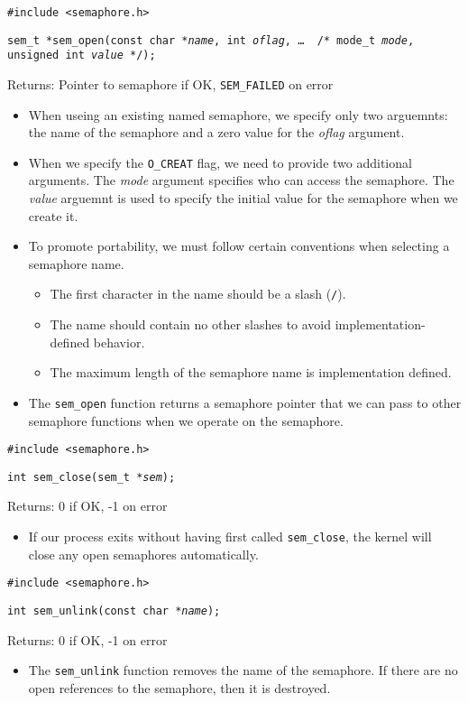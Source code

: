 \documentclass[]{article}
\newcommand{\code}{\texttt}
\begin{document}
\code{\#include <semaphore.h>}

\code{sem\_t *sem\_open(const char *\emph{name}, int \emph{oflag}, \ldots\, /*
mode\_t \emph{mode}, unsigned int \emph{value} */);}

Returns: Pointer to semaphore if OK, \code{SEM\_FAILED} on error

\begin{itemize}
\item When useing an existing named semaphore, we specify only two arguemnts:
the name of the semaphore and a zero value for the \emph{oflag} argument.
\item When we specify the \code{O\_CREAT} flag, we need to provide two
additional arguments. The \emph{mode} argument specifies who can access the
semaphore. The \emph{value} arguemnt is used to specify the initial value for
the semaphore when we create it.
\item To promote portability, we must follow certain conventions when selecting
a semaphore name.
\begin{itemize}
\item The first character in the name should be a slash (\code{/}).
\item The name should contain no other slashes to avoid implementation-defined
behavior.
\item The maximum length of the semaphore name is implementation defined.
\end{itemize}
\item The \code{sem\_open} function returns a semaphore pointer that we can pass
to other semaphore functions when we operate on the semaphore.
\end{itemize}

\code{\#include <semaphore.h>}

\code{int sem\_close(sem\_t *\emph{sem});}

Returns: 0 if OK, -1 on error

\begin{itemize}
\item If our process exits without having first called \code{sem\_close}, the
kernel will close any open semaphores automatically.
\end{itemize}

\code{\#include <semaphore.h>}

\code{int sem\_unlink(const char *\emph{name});}

Returns: 0 if OK, -1 on error

\begin{itemize}
\item The \code{sem\_unlink} function removes the name of the semaphore. If
there are no open references to the semaphore, then it is destroyed.
\end{itemize}
\end{document}
